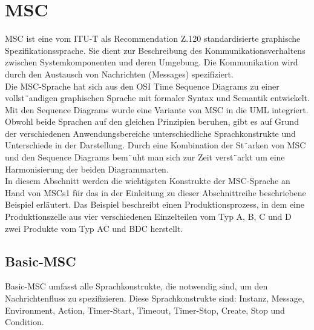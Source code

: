 
\section{MSC}
\label{sc:MSC}
MSC ist eine vom ITU-T als Recommendation Z.120
standardisierte graphische Spezifikationssprache. Sie dient
zur Beschreibung des Kommunikationsverhaltens zwischen
Systemkomponenten und deren Umgebung. Die Kommunikation
wird durch den Austausch von Nachrichten (Messages)
spezifiziert.\\
Die MSC-Sprache hat sich aus den OSI Time Sequence
Diagrams zu einer vollst¨andigen graphischen Sprache
mit formaler Syntax und Semantik entwickelt.
Mit den Sequence Diagrams wurde eine Variante von MSC
in die UML integriert. Obwohl beide Sprachen auf den
gleichen Prinzipien beruhen, gibt es auf Grund der verschiedenen
Anwendungsbereiche unterschiedliche Sprachkonstrukte
und Unterschiede in der Darstellung. Durch eine
Kombination der St¨arken von MSC und den Sequence
Diagrams bem¨uht man sich zur Zeit verst¨arkt um eine Harmonisierung der beiden Diagrammarten.\\
In diesem Abschnitt werden die wichtigsten Konstrukte der
MSC-Sprache an Hand von MSCs1 für das in der Einleitung zu dieser Abschnittreihe beschriebene Beispiel erläutert. Das Beispiel beschreibt einen Produktionsprozess, in dem eine Produktionszelle aus vier verschiedenen Einzelteilen vom Typ A, B, C und D zwei Produkte vom Typ AC und BDC herstellt.


\subsection{Basic-MSC}
Basic-MSC umfasst alle Sprachkonstrukte, die notwendig sind, um den Nachrichtenfluss zu spezifizieren. Diese
Sprachkonstrukte sind: Instanz, Message, Environment, Action, Timer-Start, Timeout, Timer-Stop, Create, Stop und
Condition.\\

